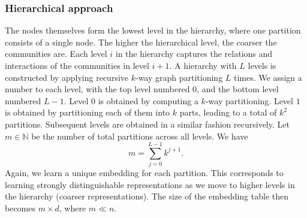 \documentclass[conference]{IEEEtran}
\DeclarePairedDelimiter{\ceil}{\lceil}{\rceil}
\begin{document}
\subsubsection{Hierarchical approach}
The nodes themselves form the lowest level in the hierarchy, where one partition consists of a single node.
The higher the hierarchical level, the coarser the communities are. 
% 
Each level $i$ in the hierarchy 
captures the relations and interactions of the communities in level $i+1$.
% 
A hierarchy with $L$ levels is constructed by applying recursive $k$-way graph partitioning $L$ times. We assign a number to each level, with the top level numbered $0$, and the bottom level numbered $L-1$.
Level $0$ is obtained by computing a $k$-way partitioning. Level $1$ is obtained by partitioning each of them into $k$ parts, leading to a total of $k^2$ partitions. Subsequent levels are obtained in a similar fashion recursively.
Let $m \in \mathbb{N}$ be the number of total partitions across all levels. We have
\begin{equation}
    m = \sum_{j=0}^{L-1} k^{j+1}.
\end{equation}
% 
Again, we learn a unique embedding for each partition. This corresponds to learning strongly distinguishable representations as we move to higher levels in the hierarchy (coarser representations). 
% 
The size of the embedding table then becomes $m \times d$, where $m \ll n$.
\end{document}
